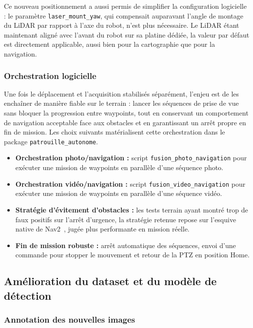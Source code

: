 \documentclass[12pt,a4paper]{article}
\begin{document}
Ce nouveau positionnement a aussi permis de simplifier la configuration logicielle : le paramètre \texttt{laser\_mount\_yaw}, qui compensait auparavant l'angle de montage du LiDAR par rapport à l'axe du robot, n'est plus nécessaire. Le LiDAR étant maintenant aligné avec l'avant du robot sur sa platine dédiée, la valeur par défaut est directement applicable, aussi bien pour la cartographie que pour la navigation.

\subsubsection{Orchestration logicielle}

Une fois le déplacement et l'acquisition stabilisés séparément, l'enjeu est de les enchaîner de manière fiable sur le terrain : lancer les séquences de prise de vue sans bloquer la progression entre waypoints, tout en conservant un comportement de navigation acceptable face aux obstacles et en garantissant un arrêt propre en fin de mission. Les choix suivants matérialisent cette orchestration dans le package \texttt{patrouille\_autonome}.

\begin{itemize}
    \item \textbf{Orchestration photo/navigation :} script \texttt{fusion\_photo\_navigation} pour exécuter une mission de waypoints en parallèle d'une séquence photo.
    \item \textbf{Orchestration vidéo/navigation :} script \texttt{fusion\_video\_navigation} pour exécuter une mission de waypoints en parallèle d'une séquence vidéo.
    \item \textbf{Stratégie d'évitement d'obstacles :} les tests terrain ayant montré trop de faux positifs sur l'arrêt d'urgence, la stratégie retenue repose sur l'esquive native de Nav2~\cite{nav2}, jugée plus performante en mission réelle.
    \item \textbf{Fin de mission robuste :} arrêt automatique des séquences, envoi d'une commande pour stopper le mouvement et retour de la PTZ en position Home.
\end{itemize}

\subsection{Amélioration du dataset et du modèle de détection}

\subsubsection{Annotation des nouvelles images}
\end{document}
